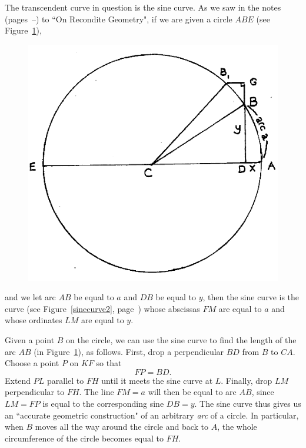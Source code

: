 \documentclass[twoside,openright]{article}
\begin{document}
The transcendent curve in question is the sine curve.  As we saw in
the notes (pages~\pageref{begsin}--\pageref{endsin}) to ``On Recondite
Geometry", if we are given a circle $ABE$ (see Figure~\ref{circarc4}),
\begin{figure}[htp]
  \begin{center}
    \includegraphics[width=.65\textwidth]{fig/Figure42}
    \caption{}
    \label{circarc4}
    \vspace{-10pt}
  \end{center}
\end{figure} and we let arc $AB$ be equal to $a$ and $DB$ be equal to
$y$, then the sine curve is the curve (see Figure~\ref{sinecurve2},
page~\pageref{sinecurve2}) whose abscissas $FM$ are equal to $a$ and
whose ordinates $LM$ are equal to $y$.

Given a point $B$ on the circle, we can use the sine curve to find the
length of the arc $AB$ (in Figure~\ref{circarc4}), as follows. First,
drop a perpendicular $BD$ from $B$ to $CA$.  Choose a point $P$ on
$KF$ so that
$$FP = BD.$$
Extend $PL$ parallel to $FH$ until it meets the sine curve at $L$.
Finally, drop $LM$ perpendicular to $FH$. The line $FM=a$ will then be
equal to arc $AB$, since $LM = FP$ is equal to the corresponding sine
$DB= y$.  The sine curve thus gives us an ``accurate geometric
construction" of an arbitrary {\em arc} of a circle.  In particular,
when $B$ moves all the way around the circle and back to $A$, the
whole circumference of the circle becomes equal to $FH$.
\end{document}
